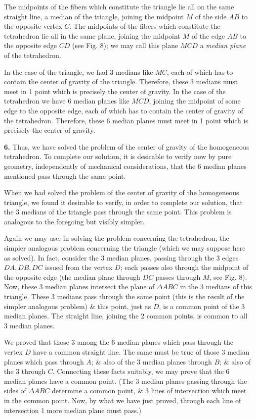 \documentclass[oneside]{book}
\numberwithin{equation}{section}
\begin{document}
The midpoints of the fibers which constitute the triangle lie all on the same straight line, a median of the triangle, joining the midpoint $M$ of the side $AB$ to the opposite vertex $C$. The midpoints of the fibers which constitute the tetrahedron lie all in the same plane, joining the midpoint $M$ of the edge $AB$ to the opposite edge $CD$ (see Fig. 8); we may call this plane $MCD$ a \textit{median plane} of the tetrahedron.

In the case of the triangle, we had 3 medians like $MC$, each of which has to contain the center of gravity of the triangle. Therefore, these 3 medians must meet in 1 point which is precisely the center of gravity. In the case of the tetrahedron we have 6 median planes like $MCD$, joining the midpoint of some edge to the opposite edge, each of which has to contain the center of gravity of the tetrahedron. Therefore, these 6 median planes must meet in 1 point which is precisely the center of gravity.

\textbf{6.} Thus, we have solved the problem of the center of gravity of the homogeneous tetrahedron. To complete our solution, it is desirable to verify now by pure geometry, independently of mechanical considerations, that the 6 median planes mentioned pass through the same point.

When we had solved the problem of the center of gravity of the homogeneous triangle, we found it desirable to verify, in order to complete our solution, that the 3 medians of the triangle pass through the same point. This problem is analogous to the foregoing but visibly simpler.

Again we may use, in solving the problem concerning the tetrahedron, the simpler analogous problem concerning the triangle (which we may suppose here as solved). In fact, consider the 3 median planes, passing through the 3 edges $DA,DB,DC$ issued from the vertex $D$; each passes also through the midpoint of the opposite edge (the median plane through $DC$ passes through $M$, see Fig. 8). Now, these 3 median planes intersect the plane of $\Delta ABC$ in the 3 medians of this triangle. These 3 medians pass through the same point (this is the result of the simpler analogous problem) \& this point, just as $D$, is a common point of the 3 median planes. The straight line, joining the 2 common points, is common to all 3 median planes.

We proved that those 3 among the 6 median planes which pass through the vertex $D$ have a common straight line. The same must be true of those 3 median planes which pass through $A$; \& also of the 3 median planes through $B$; \& also of the 3 through $C$. Connecting these facts suitably, we may prove that the 6 median planes have a common point. (The 3 median planes passing through the sides of $\Delta ABC$ determine a common point, \& 3 lines of intersection which meet in the common point. Now, by what we have just proved, through each line of intersection 1 more median plane must pass.)
\end{document}
